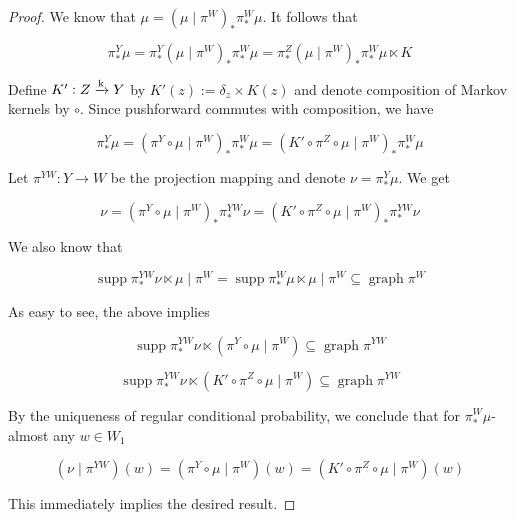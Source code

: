 \documentclass[11pt]{article}
\theoremstyle{definition}
\theoremstyle{plain}
\newcommand{\M}{\xrightarrow{\textnormal{k}}}
\DeclareMathOperator{\Gr}{graph}
\DeclareMathOperator{\Sp}{supp}
\begin{document}
\begin{proof}

We know that $\mu = \left(\mu \mid \pi^W\right)_* \pi^W_* \mu$. It follows that

\[\pi^Y_*\mu = \pi^Y_* \left(\mu \mid \pi^W\right)_* \pi^W_* \mu = \pi^Z_*\left(\mu \mid \pi^W\right)_* \pi^W_* \mu \ltimes K\]

Define $K': Z \M Y$ by $K'(z):=\delta_z \times K(z)$ and denote composition of Markov kernels by $\circ$. Since pushforward commutes with composition, we have

\[\pi^Y_*\mu = \left(\pi^Y \circ\mu \mid \pi^W\right)_* \pi^W_* \mu = \left(K'  \circ \pi^Z \circ \mu \mid \pi^W\right)_* \pi^W_* \mu\]

Let $\pi^{YW}: Y \rightarrow W$ be the projection mapping and denote $\nu = \pi^Y_* \mu$. We get

\[\nu = \left(\pi^Y \circ\mu \mid \pi^W\right)_* \pi^{YW}_* \nu = \left(K'  \circ \pi^Z \circ \mu \mid \pi^W\right)_* \pi^{YW}_* \nu\]

We also know that

\[\Sp{\pi^{YW}_* \nu \ltimes \mu \mid \pi^W} = \Sp{\pi^{W}_* \mu \ltimes \mu \mid \pi^W \subseteq \Gr{\pi^W}}\]
 
As easy to see, the above implies

\[\Sp{\pi^{YW}_* \nu \ltimes \left(\pi^Y \circ\mu \mid \pi^W\right)} \subseteq \Gr{\pi^{YW}}\]

\[\Sp{\pi^{YW}_* \nu \ltimes \left(K'  \circ \pi^Z \circ \mu \mid \pi^W\right)} \subseteq \Gr{\pi^{YW}}\]

By the uniqueness of regular conditional probability, we conclude that for $\pi^W_* \mu$-almost any $w \in W_1$

\[\left(\nu \mid \pi^{YW}\right)(w)= \left(\pi^Y \circ\mu \mid \pi^W\right)(w) = \left(K'  \circ \pi^Z \circ \mu \mid \pi^W\right)(w)\]

This immediately implies the desired result.
\end{proof}
\end{document}
